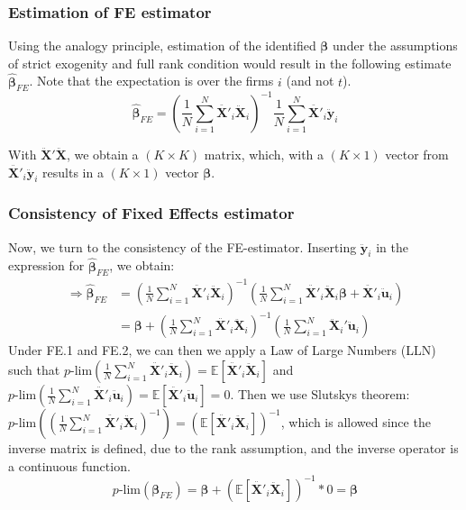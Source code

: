 \subsubsection*{Estimation of FE estimator}

Using the analogy principle, estimation of the identified $\pmb{\beta}$ under the assumptions of strict exogenity and full rank condition would result in the following estimate $\pmb{\hat{\beta}}_{FE}$. Note that the expectation is over the firms $i$ (and not $t$).
$$\pmb{\hat{\beta}}_{FE}= \left( \frac{1}{N} \sum_{i=1}^N {\pmb{\ddot{X'}}_{i} \pmb{\ddot{X}}_{i} } \right) ^{-1}\frac{1}{N} \sum_{i=1}^N {\pmb{\ddot{X'}}_{i} \pmb{\ddot{y}}_{i} }$$

With $\pmb{\ddot{X}}'\pmb{\ddot{X}}$, we obtain a $(K \times K)$ matrix, which, with a $(K \times 1)$ vector from $\pmb{\ddot{X'}}_{i} \pmb{\ddot{y}}_{i}$ results in a $(K \times 1)$ vector $\pmb{\beta}$.

\subsubsection*{Consistency of Fixed Effects estimator}
Now, we turn to the consistency of the FE-estimator. Inserting $\pmb{\ddot{y}}_i$ in the expression for $\pmb{\hat{\beta}}_{FE}$, we obtain:
\begin{align}
    \Rightarrow \pmb{\hat{\beta}}_{FE} &= \left( \frac{1}{N} \sum_{i=1}^N {\pmb{\ddot{X'}}_{i} \pmb{\ddot{X}}_{i} } \right) ^{-1} \left(\frac{1}{N} \sum_{i=1}^N {\pmb{\ddot{X'}}_{i}}\pmb{\ddot{X}}_{i} \pmb{\beta}+\pmb{\ddot{X'}}_{i}\pmb{\ddot{u}}_i \right) \nonumber \\
    &= \pmb{\beta} +\left( \frac{1}{N} \sum_{i=1}^N {\pmb{\ddot{X'}}_{i} \pmb{\ddot{X}}_{i} } \right) ^{-1} \left( \frac{1}{N} \sum_{i=1}^N {\pmb{\ddot{X}}_i' \pmb{\ddot{u}}_i} \right) \label{FE-estimator}
\end{align}
Under FE.1 and FE.2, we can then we apply a Law of Large Numbers (LLN) such that $p\text{-lim}\left(\frac{1}{N} \sum_{i=1}^N {\pmb{\ddot{X'}}_{i} \pmb{\ddot{X}}_{i} } \right)=\mathbb{E}[\pmb{\ddot{X'}}_{i} \pmb{\ddot{X}}_{i}]$ and $p\text{-lim}\left(\frac{1}{N} \sum_{i=1}^N {\pmb{\ddot{X'}}_{i} \pmb{\ddot{u}}_{i} } \right)=\mathbb{E}[\pmb{\ddot{X'}}_{i} \pmb{\ddot{u}}_{i}]=0$. Then we use Slutskys theorem: $p\text{-lim}\left( \left(\frac{1}{N} \sum_{i=1}^N {\pmb{\ddot{X'}}_{i} \pmb{\ddot{X}}_{i} } \right)^{-1}\right)=(\mathbb{E}[\pmb{\ddot{X'}}_{i} \pmb{\ddot{X}}_{i}])^{-1}$, which is allowed since the inverse matrix is defined, due to the rank assumption, and the inverse operator is a continuous function.
$$p\text{-lim}(\pmb{\beta}_{FE})=\pmb{\beta} + \left( \mathbb{E}[\ddot{\pmb{X'}}_i \ddot{\pmb{X}}_i] \right)^{-1}*0 =\pmb{\beta}$$


